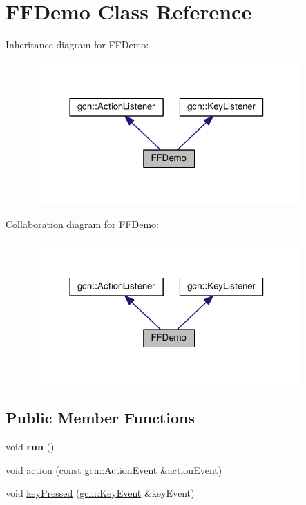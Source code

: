\hypertarget{classFFDemo}{}\section{F\+F\+Demo Class Reference}
\label{classFFDemo}


Inheritance diagram for F\+F\+Demo\+:\nopagebreak
\begin{figure}[H]
\begin{center}
\leavevmode
\includegraphics[width=290pt]{classFFDemo__inherit__graph}
\end{center}
\end{figure}


Collaboration diagram for F\+F\+Demo\+:\nopagebreak
\begin{figure}[H]
\begin{center}
\leavevmode
\includegraphics[width=290pt]{classFFDemo__coll__graph}
\end{center}
\end{figure}
\subsection*{Public Member Functions}
\begin{DoxyCompactItemize}
\item 
void {\bfseries run} ()\hypertarget{classFFDemo_ae138571c8d71404ca992bb2d7b9ae658}{}\label{classFFDemo_ae138571c8d71404ca992bb2d7b9ae658}

\item 
void \hyperlink{classFFDemo_ab7c02fe745edd2e4de4a9fd17b30abc2}{action} (const \hyperlink{classgcn_1_1ActionEvent}{gcn\+::\+Action\+Event} \&action\+Event)
\item 
void \hyperlink{classFFDemo_a0307231911726663da3e9f641601ada5}{key\+Pressed} (\hyperlink{classgcn_1_1KeyEvent}{gcn\+::\+Key\+Event} \&key\+Event)
\end{DoxyCompactItemize}
